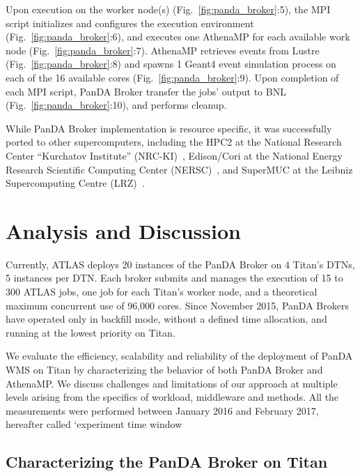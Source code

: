 \documentclass[conference]{IEEEtran}
\begin{document}
Upon execution on the worker node(s) (Fig.~\ref{fig:panda_broker}:5), the MPI
script initializes and configures the execution environment
(Fig.~\ref{fig:panda_broker}:6), and executes one AthenaMP for each available
work node (Fig.~\ref{fig:panda_broker}:7). AthenaMP retrieves events from Lustre
(Fig.~\ref{fig:panda_broker}:8) and spawns 1 Geant4 event simulation process on
each of the 16 available cores (Fig.~\ref{fig:panda_broker}:9). Upon completion
of each MPI script, PanDA Broker transfer the jobs' output to BNL
(Fig.~\ref{fig:panda_broker}:10), and performs cleanup.

While PanDA Broker implementation is resource specific, it was successfully
ported to other supercomputers, including the HPC2 at the National Research
Center ``Kurchatov Institute'' (NRC-KI)~\cite{belyaev2015integration},
Edison/Cori at the National Energy Research Scientific Computing Center
(NERSC)~\cite{barreiro2016panda}, and SuperMUC at the Leibniz Supercomputing
Centre (LRZ)~\cite{barreiro2016panda}.


\section{Analysis and Discussion}
\label{sec:panda_titan}

Currently, ATLAS deploys 20 instances of the PanDA Broker on 4 Titan's DTNs, 5
instances per DTN. Each broker submits and manages the execution of 15 to 300
ATLAS jobs, one job for each Titan's worker node, and a theoretical maximum
concurrent use of 96,000 cores. Since November 2015, PanDA Brokers have operated
only in backfill mode, without a defined time allocation, and running at the
lowest priority on Titan.

We evaluate the efficiency, scalability and reliability of the deployment of
PanDA WMS on Titan by characterizing the behavior of both PanDA Broker and
AthenaMP. We discuss challenges and limitations of our approach at multiple
levels arising from the specifics of workload, middleware and methods. All the
measurements were performed between January 2016 and February 2017, hereafter
called ‘experiment time window

\subsection{Characterizing the PanDA Broker on Titan}
\label{ssec:broker_titan}
\end{document}

